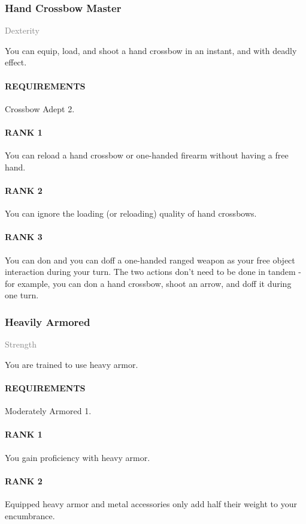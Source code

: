 \subsubsection{Hand Crossbow Master} \label{tal::handcrossbowmaster}
\small{\textcolor{gray}{Dexterity}}

\normalsize
You can equip, load, and shoot a hand crossbow in an instant, and with deadly effect.
\paragraph{REQUIREMENTS} Crossbow Adept 2.
\paragraph{RANK 1} You can reload a hand crossbow or one-handed firearm without having a free hand.
\paragraph{RANK 2} You can ignore the loading (or reloading) quality of hand crossbows.
\paragraph{RANK 3} You can don and you can doff a one-handed ranged weapon as your free object interaction during your turn.
The two actions don't need to be done in tandem - for example, you can don a hand crossbow, shoot an arrow, and doff it during one turn.

\subsubsection{Heavily Armored} \label{tal::heavilyarmored}
\small{\textcolor{gray}{Strength}}

\normalsize
You are trained to use heavy armor.
\paragraph{REQUIREMENTS} Moderately Armored 1.
\paragraph{RANK 1} You gain proficiency with heavy armor.
\paragraph{RANK 2} Equipped heavy armor and metal accessories only add half their weight to your encumbrance.
